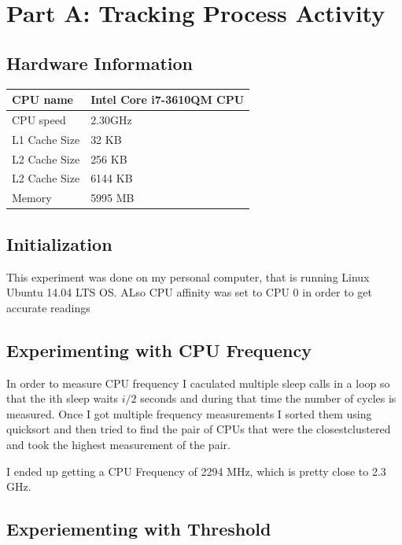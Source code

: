 \documentclass{article}
\begin{document}
\section{Part A: Tracking Process Activity}

\subsection{Hardware Information}

\begin{center}
\begin{tabular}{|l|l|}
  	\hline
  	CPU name & Intel Core i7-3610QM CPU \\ \hline
  	CPU speed & 2.30GHz \\ \hline
  	L1 Cache Size & 32 KB \\ \hline
	L2 Cache Size & 256 KB \\ \hline
	L2 Cache Size & 6144 KB \\ \hline
	Memory & 5995 MB \\ \hline
\end{tabular}
\end{center}

\subsection{Initialization}

This experiment was done on my personal computer, that is running Linux Ubuntu 14.04 LTS OS. ALso CPU affinity was set to CPU 0 in order to get accurate readings

\subsection{Experimenting with CPU Frequency}

In order to measure CPU frequency I caculated multiple sleep calls in a loop so that the ith sleep waits $i/2$ seconds and during that time the number of cycles is measured. Once I got multiple frequency measurements I sorted them using quicksort and then tried to find the pair of CPUs that were the closest\/clustered and took the highest measurement of the pair. 

I ended up getting a CPU Frequency of 2294 MHz, which is pretty close to 2.3 GHz.

\subsection{Experiementing with Threshold}
\end{document}
